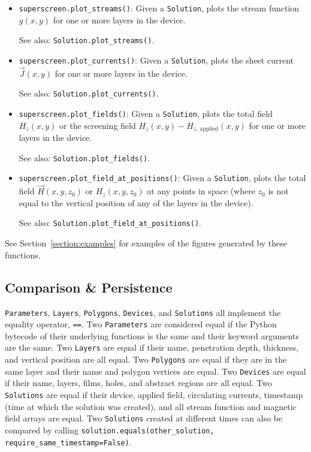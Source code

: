 \documentclass[preprint,12pt]{elsarticle}
\begin{document}
\begin{itemize}
    \item{
    \texttt{superscreen.plot_streams()}: Given a \texttt{Solution}, plots the stream function $g(x, y)$ for one or more layers in the device.
    
    See also: \texttt{Solution.plot_streams()}.
    }
    \item{
    \texttt{superscreen.plot_currents()}: Given a \texttt{Solution}, plots the sheet current $\vec{J}(x, y)$ for one or more layers in the device.
    
    See also: \texttt{Solution.plot_currents()}.
    }
    \item{
    \texttt{superscreen.plot_fields()}: Given a \texttt{Solution}, plots the total field $H_z(x, y)$ or the screening field $H_z(x, y) - H_{z,\,\mathrm{applied}}(x, y)$ for one or more layers in the device.
    
    See also: \texttt{Solution.plot_fields()}.
    }
    \item{
    \texttt{superscreen.plot_field_at_positions()}: Given a \texttt{Solution}, plots the total field $\vec{H}(x, y, z_0)$ or $H_z(x, y, z_0)$ at any points in space (where $z_0$ is not equal to the vertical position of any of the layers in the device).
    
    See also: \texttt{Solution.plot_field_at_positions()}.
    }
\end{itemize}

See Section~\ref{section:examples} for examples of the figures generated by these functions.

\subsection{Comparison \& Persistence}
\label{section:overview:persistence}

\texttt{Parameters}, \texttt{Layers}, \texttt{Polygons}, \texttt{Devices}, and \texttt{Solutions} all implement the equality operator, \texttt{==}. Two \texttt{Parameters} are considered equal if the Python bytecode of their underlying functions is the same and their keyword arguments are the same. Two \texttt{Layers} are equal if their name, penetration depth, thickness, and vertical position are all equal. Two \texttt{Polygons} are equal if they are in the same layer and their name and polygon vertices are equal. Two \texttt{Devices} are equal if their name, layers, films, holes, and abstract regions are all equal. Two \texttt{Solutions} are equal if their device, applied field, circulating currents, timestamp (time at which the solution was created), and all stream function and magnetic field arrays are equal. Two \texttt{Solutions} created at different times can also be compared by calling \texttt{solution.equals(other_solution, require_same_timestamp=False)}.
\end{document}
